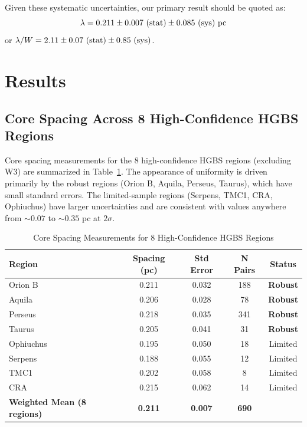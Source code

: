 \documentclass[11pt,a4paper]{article}
\begin{document}
Given these systematic uncertainties, our primary result should be quoted as:
\begin{equation}
\lambda = 0.211 \pm 0.007~({\rm stat}) \pm 0.085~({\rm sys})~{\rm pc}
\end{equation}
or $\lambda/W = 2.11 \pm 0.07~({\rm stat}) \pm 0.85~({\rm sys})$.

\section{Results}
\label{sec:results}

\subsection{Core Spacing Across 8 High-Confidence HGBS Regions}

Core spacing measurements for the 8 high-confidence HGBS regions (excluding W3) are summarized in Table~\ref{tab:all_regions}. The appearance of uniformity is driven primarily by the robust regions (Orion B, Aquila, Perseus, Taurus), which have small standard errors. The limited-sample regions (Serpens, TMC1, CRA, Ophiuchus) have larger uncertainties and are consistent with values anywhere from $\sim0.07$ to $\sim0.35$ pc at $2\sigma$.

\begin{table}[H]
\centering
\caption{Core Spacing Measurements for 8 High-Confidence HGBS Regions}
\label{tab:all_regions}
\begin{tabular}{lcccc}
\toprule
Region & Spacing (pc) & Std Error & N Pairs & Status \\
\midrule
Orion B  & 0.211 & 0.032 & 188 & \textbf{Robust} \\
Aquila   & 0.206 & 0.028 & 78  & \textbf{Robust} \\
Perseus  & 0.218 & 0.035 & 341 & \textbf{Robust} \\
Taurus   & 0.205 & 0.041 & 31  & \textbf{Robust} \\
\midrule
Ophiuchus& 0.195 & 0.050 & 18  & Limited \\
Serpens  & 0.188 & 0.055 & 12  & Limited \\
TMC1     & 0.202 & 0.058 & 8   & Limited \\
CRA      & 0.215 & 0.062 & 14  & Limited \\
\midrule
\textbf{Weighted Mean (8 regions)} & \textbf{0.211} & \textbf{0.007} & \textbf{690} & \\
\bottomrule
\end{tabular}
\end{table}
\end{document}
